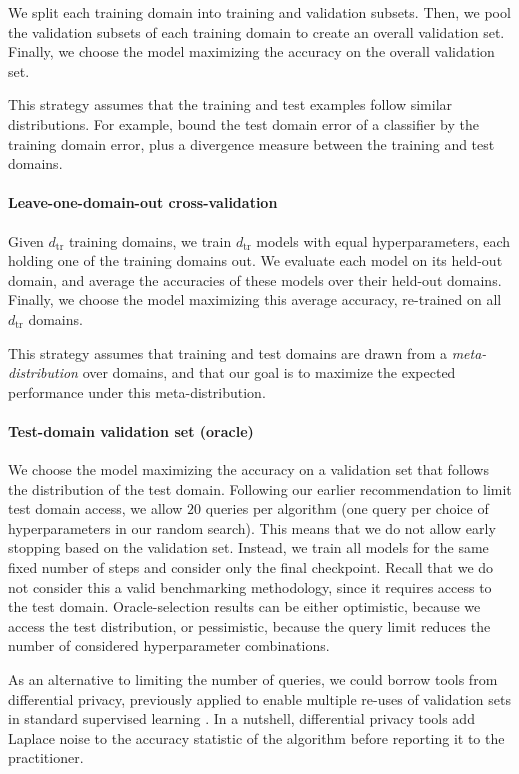 \documentclass{article}
\newcommand{\dtr}{{d_\mathrm{tr}}}
\begin{document}
We split each training domain into training and validation subsets.
Then, we pool the validation subsets of each training domain to create an overall validation set.
Finally, we choose the model maximizing the accuracy on the overall validation set.

This strategy assumes that the training and test examples follow similar distributions.
For example, \citet{ben2010theory} bound the test domain error of a classifier by the training domain error, plus a divergence measure between the training and test domains.


\paragraph{Leave-one-domain-out cross-validation}

Given $\dtr$ training domains, we train $\dtr$ models with equal hyperparameters, each holding one of the training domains out.
We evaluate each model on its held-out domain, and average the accuracies of these models over their held-out domains.
Finally, we choose the model maximizing this average accuracy, re-trained on all $\dtr$ domains.

This strategy assumes that training and test domains are drawn from a \emph{meta-distribution} over domains, and that our goal is to maximize the expected performance under this meta-distribution.

\paragraph{Test-domain validation set (oracle)}

We choose the model maximizing the accuracy on a validation set that follows the distribution of the test domain.
Following our earlier recommendation to limit test domain access, we allow $20$ queries per algorithm (one query per choice of hyperparameters in our random search).
This means that we do not allow early stopping based on the validation set.
Instead, we train all models for the same fixed number of steps and consider only the final checkpoint.
Recall that we do not consider this a valid benchmarking methodology, since it requires access to the test domain.
Oracle-selection results can be either optimistic, because we access the test distribution, or pessimistic, because the query limit reduces the number of considered hyperparameter combinations.

As an alternative to limiting the number of queries, we could borrow tools from differential privacy, previously applied to enable multiple re-uses of validation sets in standard supervised learning \citep{dwork2015reusable}. 
In a nutshell, differential privacy tools add Laplace noise to the accuracy statistic of the algorithm before reporting it to the practitioner.
\end{document}
